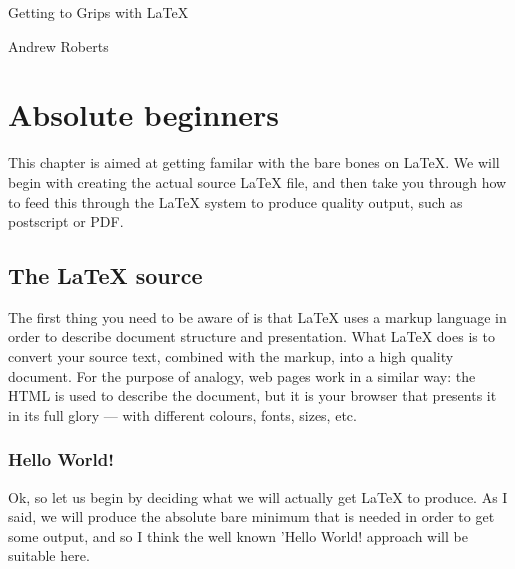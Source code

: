\documentclass[a4paper,10pt]{book}
\begin{document}
\frontmatter

\thispagestyle{empty}

\begin{flushright}
\vspace*{1.5in}

{\huge Getting to Grips with \LaTeX}

\vspace{0.25in}

{\Large Andrew Roberts}


\vfill

\end{flushright}


\setcounter{tocdepth}{1}

\tableofcontents

\mainmatter
\chapter{Absolute beginners}

This chapter is aimed at getting familar with the bare bones on
\LaTeX{}. We will begin with creating the actual source \LaTeX{} file,
and then take you through how to feed this through the \LaTeX{} system
to produce quality output, such as postscript or PDF.

\section{The \LaTeX{} source}

The first thing you need to be aware of is that \LaTeX{} uses a markup
language in order to describe document structure and presentation. What
\LaTeX{} does is to convert your source text, combined with the markup,
into a high quality document. For the purpose of analogy, web pages work
in a similar way: the HTML is used to describe the document, but it is
your browser that presents it in its full glory --- with different
colours, fonts, sizes, etc.

\subsection{Hello World!}

Ok, so let us begin by deciding what we will actually get \LaTeX{} to
produce. As I said, we will produce the absolute bare minimum that is
needed in order to get some output, and so I think the well known 'Hello
World! approach will be suitable here.
\end{document}
